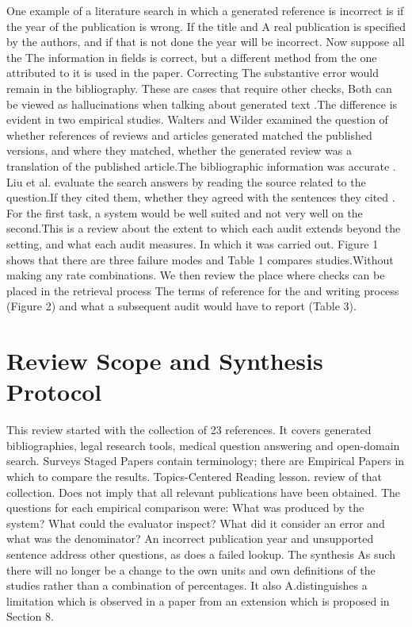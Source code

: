 \documentclass[acmsmall,screen,nonacm]{acmart}
\begin{document}
One example of a literature search in which a generated reference is incorrect is if the year of the publication is wrong. If the title and A real publication is specified by the authors, and if that is not done the year will be incorrect. Now suppose all the The information in fields is correct, but a different method from the one attributed to it is used in the paper. Correcting The substantive error would remain in the bibliography. These are cases that require other checks, Both can be viewed as hallucinations when talking about generated text \cite{ref9,ref11}.The difference is evident in two empirical studies. Walters and Wilder examined the question of whether references of reviews and articles generated matched the published versions, and where they matched, whether the generated review was a translation of the published article.The bibliographic information was accurate \cite{ref22}. Liu et al. evaluate the search answers by reading the source related to the question.If they cited them, whether they agreed with the sentences they cited \cite{ref13}. For the first task, a system would be well suited and not very well on the second.This is a review about the extent to which each audit extends beyond the setting, and what each audit measures. In which it was carried out. Figure 1 shows that there are three failure modes and Table 1 compares studies.Without making any rate combinations. We then review the place where checks can be placed in the retrieval process The terms of reference for the and writing process (Figure 2) and what a subsequent audit would have to report (Table 3).

\section{Review Scope and Synthesis Protocol}

This review started with the collection of 23 references. It covers generated bibliographies, legal research tools, medical question answering and open-domain search. Surveys Staged Papers contain terminology; there are Empirical Papers in which to compare the results. Topics-Centered Reading
lesson. review of that collection. Does not imply that all relevant publications have been obtained. The questions for each empirical comparison were: What was produced by the system? What could the evaluator inspect? What did it consider an error and what was the denominator? An incorrect publication year and unsupported sentence address other questions, as does a failed lookup. The synthesis As such there will no longer be a change to the own units and own definitions of the studies rather than a combination of percentages. It also A.distinguishes a limitation which is observed in a paper from an extension which is proposed in Section 8.
\end{document}
